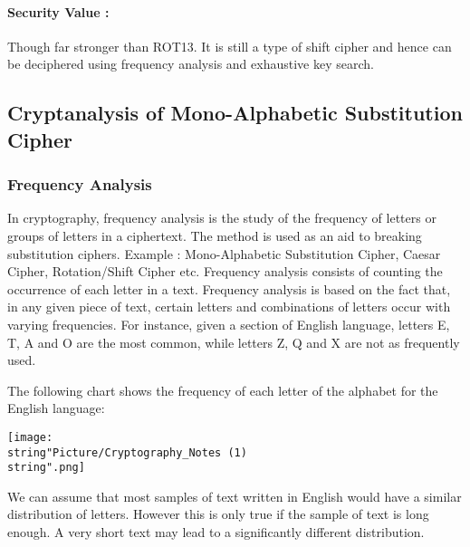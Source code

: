 \documentclass[british]{article}
\begin{document}
\paragraph*{Security Value : }

Though far stronger than ROT13. It is still a type of shift cipher
and hence can be deciphered using frequency analysis and exhaustive
key search.

\vfill{}


\subsection{Cryptanalysis of Mono-Alphabetic Substitution Cipher}

\subsubsection{Frequency Analysis}

In cryptography, frequency analysis is the study of the frequency
of letters or groups of letters in a ciphertext. The method is used
as an aid to breaking substitution ciphers. Example : Mono-Alphabetic
Substitution Cipher, Caesar Cipher, Rotation/Shift Cipher etc. Frequency
analysis consists of counting the occurrence of each letter in a text.
Frequency analysis is based on the fact that, in any given piece of
text, certain letters and combinations of letters occur with varying
frequencies. For instance, given a section of English language, letters
E, T, A and O are the most common, while letters Z, Q and X are not
as frequently used.

\medskip{}

\begin{center}
	The following chart shows the frequency of each letter of the alphabet
	for the English language:
	\par\end{center}

\begin{center}
	\texttt{[image: \\string"Picture/Cryptography\_Notes (1)\\string".png]}
	\par\end{center}

\medskip{}

We can assume that most samples of text written in English would have
a similar distribution of letters. However this is only true if the
sample of text is long enough. A very short text may lead to a significantly
different distribution.
\end{document}
